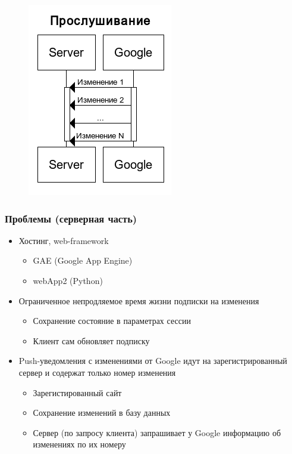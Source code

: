 \documentclass[10pt,pdf,hyperref={unicode}]{beamer}
\begin{document}
\begin{frame}
\begin{figure}[ht]
\begin{minipage}[b]{0.5\linewidth}
            \end{minipage}%
            \begin{minipage}[b]{0.5\linewidth}
                \centering
                \includegraphics[scale=0.3]{listening.png} 
            \end{minipage} 
        \end{figure}
    \end{frame}
    
    \begin{frame}\frametitle{Проблемы (серверная часть)}
        \begin{itemize}%
	        \item	Хостинг, web-framework
	        \pause
            \begin{itemize}
                \item GAE (Google App Engine)
                \item webApp2 (Python)       
            \end{itemize}
	        \pause
            \item	Ограниченное непродляемое время жизни подписки на изменения
	        \pause
            \begin{itemize}
                \item Сохранение состояние в параметрах сессии
                \item Клиент сам обновляет подписку
            \end{itemize}
	        \pause
            \item	Push-уведомления с изменениями от Google идут на зарегистрированный сервер и содержат только номер изменения
	        \pause
            \begin{itemize}
                \item Зарегистированный сайт
                \item Сохранение изменений в базу данных
                \item Сервер (по запросу клиента) запрашивает у Google информацию об изменениях по их номеру
            \end{itemize}
        \end{itemize}
    \end{frame}
    
\end{document}
